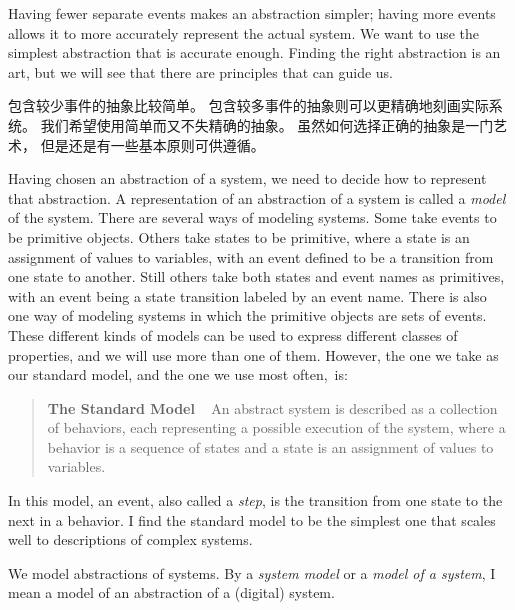 \begin{en}
Having fewer separate events makes an abstraction simpler; having more
events allows it to more accurately represent the actual system.  We
want to use the simplest abstraction that is accurate enough.  Finding
the right abstraction is an art, but we will see that there are
principles that can guide us.
\end{en}

\begin{ch}
  包含较少事件的抽象比较简单。
  包含较多事件的抽象则可以更精确地刻画实际系统。
  我们希望使用简单而又不失精确的抽象。
  虽然如何选择正确的抽象是一门艺术，
  但是还是有一些基本原则可供遵循。
\end{ch}

\begin{en}
Having chosen an abstraction of a system, we need to decide how to
represent that abstraction.  A representation of an abstraction of a
system is called a 
\emph{model} of the system.  There are several ways
of modeling systems.  Some take events to be primitive objects.
Others take states to be primitive, where a state is an assignment of
values to variables, with an event defined to be a transition from one
state to another.  Still others take both states and event names as
primitives, with an event being a state transition labeled by an event
name.  There is also one way of modeling systems in which the
primitive objects are sets of events.  These different kinds of models
can be used to express different classes of properties, and we will
use more than one of them.  However, the one we take as our standard
model, and the one we use most often,~is:
\begin{quote}
\textbf{The Standard Model} \  
An 
abstract system is described as a collection of behaviors, each
representing a possible execution of the system, where a 
behavior is a
sequence of states and a 
state is an assignment of values to
variables.
\end{quote}
In this model, an 
event, also called a 
\emph{step}, is the transition from one state to the next in a
behavior.  I find the standard model to be the simplest one that
scales well to descriptions of complex systems.

We model abstractions of systems.  By a \emph{system model} or a
\emph{model of a system}, I mean a model of an abstraction of a
(digital) system.
\end{en}

